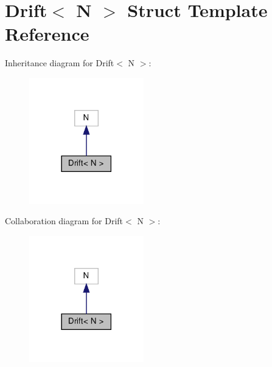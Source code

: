 \hypertarget{structDrift}{}\section{Drift$<$ N $>$ Struct Template Reference}
\label{structDrift}


Inheritance diagram for Drift$<$ N $>$\+:\nopagebreak
\begin{figure}[H]
\begin{center}
\leavevmode
\includegraphics[width=141pt]{structDrift__inherit__graph}
\end{center}
\end{figure}


Collaboration diagram for Drift$<$ N $>$\+:\nopagebreak
\begin{figure}[H]
\begin{center}
\leavevmode
\includegraphics[width=141pt]{structDrift__coll__graph}
\end{center}
\end{figure}
